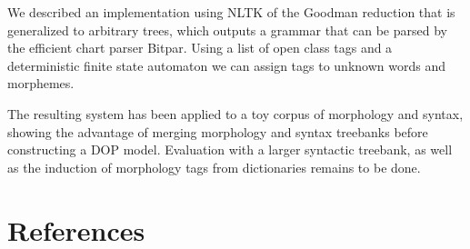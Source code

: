 \documentclass[10pt,a4paper]{article}
\begin{document}
We described an implementation using NLTK of the Goodman reduction that is
generalized to arbitrary trees, which outputs a grammar that can be parsed by
the efficient chart parser Bitpar. Using a list of open class tags and a
deterministic finite state automaton we can assign tags to unknown words and
morphemes.

The resulting system has been applied to a toy corpus of morphology and
syntax, showing the advantage of merging morphology and syntax treebanks
before constructing a DOP model. Evaluation with a larger syntactic treebank,
as well as the induction of morphology tags from dictionaries remains to be
done.


\section{References}
\end{document}
